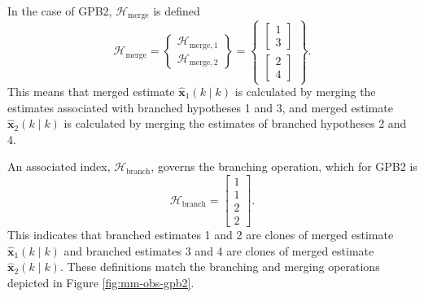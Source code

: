 {In the case of \gls{GPB2}, $\mathcal{H}_{\text{merge}}$ is defined
\begin{equation} \label{eq:Hmerge_GPB2}
	\mathcal{H}_{\text{merge}} = \begin{Bmatrix} \mathcal{H}_{\text{merge},1} \\ \mathcal{H}_{\text{merge},2} \end{Bmatrix} = \begin{Bmatrix}
		\begin{bmatrix}	1 \\ 3 \end{bmatrix} \\
		\begin{bmatrix}	2 \\ 4 \end{bmatrix}
	\end{Bmatrix}.
\end{equation}
This means that merged estimate $\mathbf{\hat{x}}_1(k \mid k)$ is calculated by merging the estimates associated with branched hypotheses 1 and 3, and merged estimate $\mathbf{\hat{x}}_2(k \mid k)$ is calculated by merging the estimates of branched hypotheses 2 and 4.

An associated index, $\mathcal{H}_{\text{branch}}$, governs the branching operation, which for \gls{GPB2} is
%
\begin{equation} \label{eq:Hbranch_GPB2}
	\mathcal{H}_{\text{branch}} = \begin{bmatrix} 1 \\ 1 \\ 2 \\ 2 \end{bmatrix}.
\end{equation}
This indicates that branched estimates 1 and 2 are clones of merged estimate $\mathbf{\hat{x}}_1(k \mid k)$ and branched estimates 3 and 4 are clones of merged estimate $\mathbf{\hat{x}}_2(k \mid k)$. These definitions match the branching and merging operations depicted in Figure \ref{fig:mm-obs-gpb2}.

}

